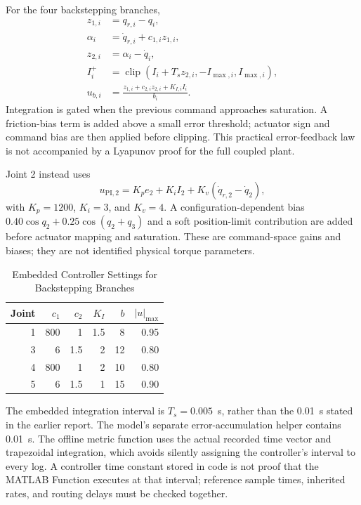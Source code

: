 \documentclass[conference,letterpaper]{IEEEtran}
\begin{document}
For the four backstepping branches,
\begin{align}
z_{1,i}&=q_{r,i}-q_i,\\
\alpha_i&=\dot q_{r,i}+c_{1,i}z_{1,i},\\
z_{2,i}&=\alpha_i-\dot q_i,\\
I_i^+&=\operatorname{clip}(I_i+T_sz_{2,i},-I_{\max,i},I_{\max,i}),\\
u_{b,i}&=\frac{z_{1,i}+c_{2,i}z_{2,i}+K_{I,i}I_i}{b_i}.
\end{align}
Integration is gated when the previous command approaches saturation. A friction-bias term is added above a small error threshold; actuator sign and command bias are then applied before clipping. This practical error-feedback law is not accompanied by a Lyapunov proof for the full coupled plant.

Joint 2 instead uses
\begin{equation}
u_{\mathrm{PI},2}=K_pe_2+K_iI_2+K_v(\dot q_{r,2}-\dot q_2),
\end{equation}
with $K_p=1200$, $K_i=3$, and $K_v=4$. A configuration-dependent bias $0.40\cos q_2+0.25\cos(q_2+q_3)$ and a soft position-limit contribution are added before actuator mapping and saturation. These are command-space gains and biases; they are not identified physical torque parameters.

\begin{table}[t]
\caption{Embedded Controller Settings for Backstepping Branches}
\label{tab:gains}
\centering
\begin{tabular}{rrrrrr}
\hline
Joint & $c_1$ & $c_2$ & $K_I$ & $b$ & $|u|_{\max}$\\\hline
1 & 800 & 1 & 1.5 & 8 & 0.95\\
3 & 6 & 1.5 & 2 & 12 & 0.80\\
4 & 800 & 1 & 2 & 10 & 0.80\\
5 & 6 & 1.5 & 1 & 15 & 0.90\\\hline
\end{tabular}
\end{table}

The embedded integration interval is $T_s=0.005$~s, rather than the 0.01~s stated in the earlier report. The model's separate error-accumulation helper contains 0.01~s. The offline metric function uses the actual recorded time vector and trapezoidal integration, which avoids silently assigning the controller's interval to every log. A controller time constant stored in code is not proof that the MATLAB Function executes at that interval; reference sample times, inherited rates, and routing delays must be checked together.
\end{document}
